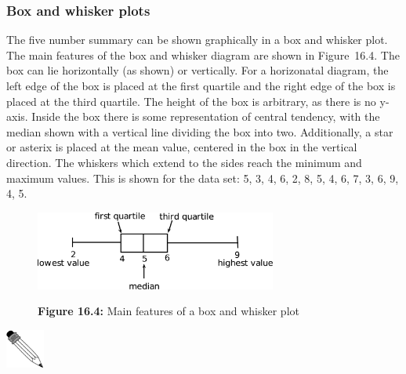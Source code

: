 \begin{description}[noitemsep]
\begin{description}[noitemsep]
            \subsubsection{ Box and whisker plots}
            \nopagebreak
            \label{m39400*eip-148}The five number summary can be shown graphically in a box and whisker plot. The main features of the box and whisker diagram are shown in Figure~16.4. The box can lie horizontally (as shown) or vertically. For a horizonatal diagram, the left edge of the box is placed
at the first quartile and the right edge of the box is placed at the third quartile. The height of
the box is arbitrary, as there is no y-axis. Inside the box there is some representation of central
tendency, with the median shown with a vertical line dividing the box into two. Additionally, a
star or asterix is placed at the mean value, centered in the box in the vertical direction. The
whiskers which extend to the sides reach the minimum and maximum values. This is shown for the data set: 5, 3, 4, 6, 2, 8, 5, 4, 6, 7, 3, 6, 9, 4, 5.
\par \label{m39400*eip-427}
    \setcounter{subfigure}{0}
	\begin{figure}[H] %
    \begin{center}
    \label{m39400*id63458!!!underscore!!!media}\label{m39400*id63458!!!underscore!!!printimage}\includegraphics[width=300px]{col11306.imgs/m39400_boxwhisker.png} %
      \vspace{2pt}
    \vspace{\rubberspace}\par \begin{cnxcaption}
	  \small \textbf{Figure 16.4: }Main features of a box and whisker plot
	\end{cnxcaption}
    \vspace{.1in}
    \end{center}
 \end{figure}       \par \par
            \label{m39400*eip-742}\vspace{.5cm} 
      \noindent
      \hspace*{-30pt}\includegraphics[width=0.5in]{col11306.imgs/pspencil2.png}   \raisebox{25mm}{   
}
\end{description}
\end{description}
